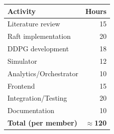 \documentclass[journal]{IEEEtran}
\begin{document}
\begin{table}[h]
\centering
\begin{tabular}{@{}lr@{}}
\toprule
\textbf{Activity} & \textbf{Hours} \\
\midrule
Literature review & 15 \\
Raft implementation & 20 \\
DDPG development & 18 \\
Simulator & 12 \\
Analytics/Orchestrator & 10 \\
Frontend & 15 \\
Integration/Testing & 20 \\
Documentation & 10 \\
\midrule
\textbf{Total (per member)} & \textbf{$\approx$120} \\
\bottomrule
\end{tabular}
\end{table}



\end{document}
